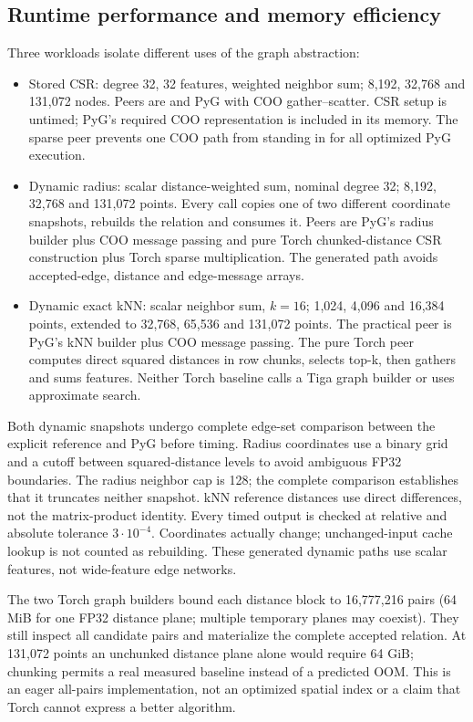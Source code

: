 \subsection{Runtime performance and memory efficiency}
\label{sec:performance}
Three workloads isolate different uses of the graph abstraction:
\begin{itemize}
\item Stored CSR: degree 32, 32 features, weighted neighbor sum; 8,192,
32,768 and 131,072 nodes. Peers are  and PyG
 with COO gather--scatter. CSR setup is untimed; PyG's
required COO representation is included in its memory. The sparse peer prevents
one COO path from standing in for all optimized PyG execution.
\item Dynamic radius: scalar distance-weighted sum, nominal degree 32;
8,192, 32,768 and 131,072 points. Every call copies one of two different coordinate
snapshots, rebuilds the relation and consumes it. Peers are PyG's radius builder
plus COO message passing and pure Torch chunked-distance CSR construction plus
Torch sparse multiplication. The generated path avoids accepted-edge, distance and
edge-message arrays.
\item Dynamic exact kNN: scalar neighbor sum, $k=16$; 1,024, 4,096 and 16,384
points, extended to 32,768, 65,536 and 131,072 points. The practical peer is PyG's
kNN builder plus COO message passing. The pure Torch peer computes direct squared
distances in row chunks, selects top-k, then gathers and sums features.
Neither Torch baseline calls a Tiga graph builder or uses approximate search.
\end{itemize}

Both dynamic snapshots undergo complete edge-set comparison between the explicit
reference and PyG before timing. Radius coordinates use a binary grid and a
cutoff between squared-distance levels to avoid ambiguous FP32 boundaries.
The radius neighbor cap is 128; the complete comparison establishes that it
truncates neither snapshot. kNN reference distances use direct differences,
not the matrix-product identity. Every timed output is checked at relative and
absolute tolerance $3\cdot10^{-4}$. Coordinates actually change; unchanged-input
cache lookup is not counted as rebuilding. These generated dynamic paths use
scalar features, not wide-feature edge networks.

The two Torch graph builders bound each distance block to 16,777,216 pairs
(64 MiB for one FP32 distance plane; multiple temporary planes may coexist).
They still inspect all candidate pairs and materialize the complete accepted
relation. At 131,072 points an unchunked distance plane alone would require
64 GiB; chunking permits a real measured baseline instead of a predicted OOM.
This is an eager all-pairs implementation, not an optimized spatial index or a
claim that Torch cannot express a better algorithm.

